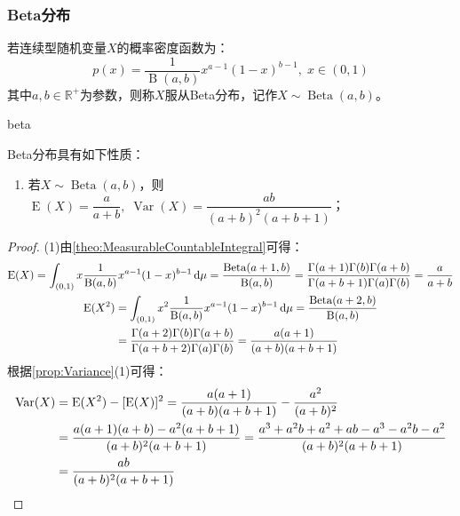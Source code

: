 \subsubsection{Beta分布}
\begin{definition}
	若连续型随机变量$X$的概率密度函数为：
	\begin{equation*}
		p(x)=\frac{1}{\operatorname{B}(a,b)}x^{a-1}(1-x)^{b-1},\;x\in(0,1)
	\end{equation*}
	其中$a,b\in\mathbb{R}^{+}$为参数，则称$X$服从Beta分布，记作$X\sim\operatorname{Beta}(a,b)$。
\end{definition}
\begin{densityplot}{beta}
	\caption{Beta分布 $\operatorname{Beta}(2,5)$ 的概率密度函数}
\end{densityplot}
\begin{property}
	Beta分布具有如下性质：
	\begin{enumerate}
		\item 若$X\sim\operatorname{Beta}(a,b)$，则$\operatorname{E}(X)=\dfrac{a}{a+b},\;\operatorname{Var}(X)=\dfrac{ab}{(a+b)^2(a+b+1)}$；
	\end{enumerate}
\end{property}
\begin{proof}
	(1)由\cref{theo:MeasurableCountableIntegral}可得：
	\begin{gather*}
		\operatorname{E}(X)=\int_{(0,1)}x\frac{1}{\operatorname{B}(a,b)}x^{a-1}(1-x)^{b-1}\mathop{}\!\mathrm{d}\mu=\frac{\operatorname{Beta}(a+1,b)}{\operatorname{B}(a,b)}=\frac{\Gamma(a+1)\Gamma(b)\Gamma(a+b)}{\Gamma(a+b+1)\Gamma(a)\Gamma(b)}=\frac{a}{a+b} \\
		\begin{aligned}
			\operatorname{E}(X^2)&=\int_{(0,1)}x^2\frac{1}{\operatorname{B}(a,b)}x^{a-1}(1-x)^{b-1}\mathop{}\!\mathrm{d}\mu=\frac{\operatorname{Beta}(a+2,b)}{\operatorname{B}(a,b)} \\
			&=\frac{\Gamma(a+2)\Gamma(b)\Gamma(a+b)}{\Gamma(a+b+2)\Gamma(a)\Gamma(b)}=\frac{a(a+1)}{(a+b)(a+b+1)}
		\end{aligned}
	\end{gather*}
	根据\cref{prop:Variance}(1)可得：
	\begin{align*}
		\operatorname{Var}(X)&=\operatorname{E}(X^2)-[\operatorname{E}(X)]^2=\frac{a(a+1)}{(a+b)(a+b+1)}-\frac{a^2}{(a+b)^2} \\
		&=\frac{a(a+1)(a+b)-a^2(a+b+1)}{(a+b)^2(a+b+1)}=\frac{a^3+a^2b+a^2+ab-a^3-a^2b-a^2}{(a+b)^2(a+b+1)} \\
		&=\frac{ab}{(a+b)^2(a+b+1)}\qedhere
	\end{align*}
\end{proof}

